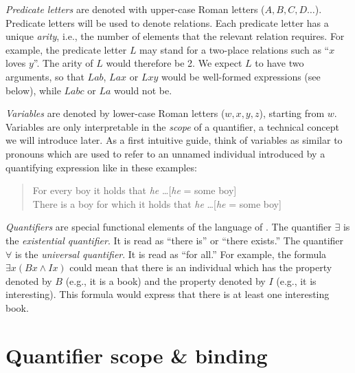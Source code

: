 \documentclass[nobib,nofonts]{tufte-handout}
\newcommand{\mygray}[1]{\textcolor{mygray2}{#1}}
\newcommand{\predlog}{\acro{PredLog}}
\begin{document}
\emph{Predicate letters} are denoted with upper-case Roman letters ($A, B, C, D \dots$).
Predicate letters will be used to denote relations.
Each predicate letter has a unique \emph{arity}, i.e., the number of elements that the relevant relation requires.
For example, the predicate letter $L$ may stand for a two-place relations such as ``$x$ loves $y$''.
The arity of $L$ would therefore be 2.
We expect $L$ to have two arguments, so that $Lab$, $Lax$ or $Lxy$ would be well-formed expressions (see below), while $Labc$ or $La$ would not be.

\emph{Variables} are denoted by lower-case Roman letters ($w, x,y,z$), starting from $w$.
Variables are only interpretable in the \emph{scope} of a quantifier, a technical concept we will introduce later.
As a first intuitive guide, think of variables as similar to pronouns which are used to refer to an unnamed individual introduced by a quantifying expression like in these examples:

\begin{quote}
For every boy it holds that \emph{he} \dots \hfill \mygray{[\emph{he} = some boy]}\\
There is a boy for which it holds that \emph{he} \dots \hfill \mygray{[\emph{he} = some boy]}\\
\end{quote}

\emph{Quantifiers} are special functional elements of the language of \predlog.
The quantifier $\exists$ is the \emph{existential quantifier}.
It is read as ``there is'' or ``there exists.''
The quantifier $\forall$ is the \emph{universal quantifier}.
It is read as ``for all.''
For example, the formula $\exists x (Bx \wedge Ix)$ could mean that there is an individual which has the property denoted by $B$ (e.g., it is a book) and the property denoted by $I$ (e.g., it is interesting).
This formula would express that there is at least one interesting book.


\section{Quantifier scope \& binding}
\end{document}
